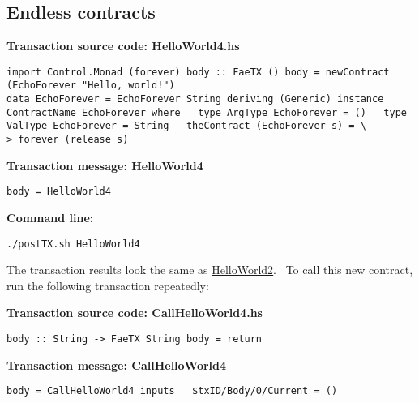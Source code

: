 \documentclass[11pt]{article}
\newcommand{\codeblock}[1]{\begin{mdframed}[
    backgroundcolor=header-color,
    linecolor=header-color,
    innertopmargin=10pt,
    ]{\texttt{#1}}\end{mdframed}}
\DeclareRobustCommand{\fuline}[1]{\texorpdfstring{\uline{#1}}{#1}}
\begin{document}
\subsection{Endless contracts}
\vspace{5.5pt}

\textbf{Transaction source code: HelloWorld4.hs}

\codeblock{import Control.Monad (forever)\newline
\newline
body :: FaeTX ()\newline
body = newContract (EchoForever "Hello, world!")\newline
\newline
data EchoForever = EchoForever String deriving (Generic)\newline
\newline
instance ContractName EchoForever where\newline
  type ArgType EchoForever = ()\newline
  type ValType EchoForever = String\newline
  theContract (EchoForever s) = \textbackslash{}\_ -\textgreater{} forever (release s)}

\textbf{Transaction message: HelloWorld4}

\codeblock{body = HelloWorld4}

\textbf{Command line:}

\codeblock{.\slash{}postTX.sh HelloWorld4}

The transaction results look the same as \href{https://consensys.quip.com/IHP2AzL922EJ/Tutorial-1-Transactions-and-contracts\%23PfaACAL7oXx}{\fuline{HelloWorld2}}.  To call this new contract, run the following transaction repeatedly:


\vspace{11pt}

\textbf{Transaction source code: CallHelloWorld4.hs}

\codeblock{body :: String -\textgreater{} FaeTX String\newline
body = return}

\textbf{Transaction message: CallHelloWorld4}

\codeblock{body = CallHelloWorld4\newline
inputs\newline
  \$txID\slash{}Body\slash{}0\slash{}Current = ()}
\end{document}
